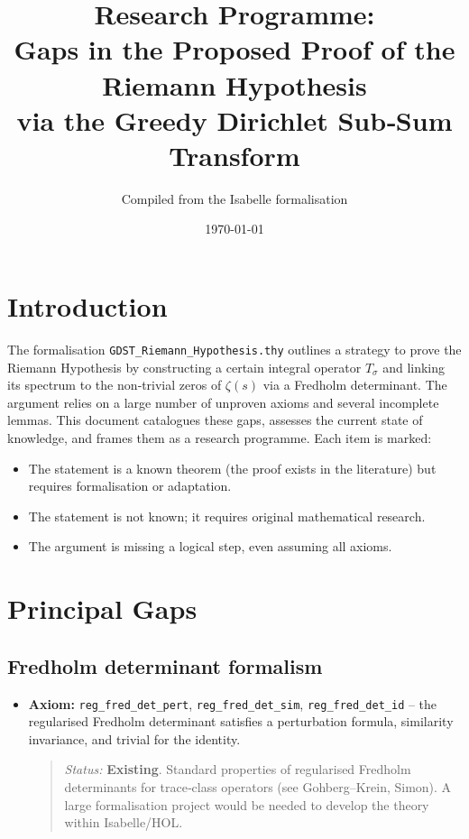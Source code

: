\documentclass{article}
\title{Research Programme:\\
Gaps in the Proposed Proof of the Riemann Hypothesis\\
via the Greedy Dirichlet Sub‑Sum Transform}
\author{Compiled from the Isabelle formalisation}
\date{\today}
\begin{document}
\maketitle
\section{Introduction}
The formalisation \texttt{GDST\_Riemann\_Hypothesis.thy} outlines a strategy to prove the Riemann Hypothesis by constructing a certain integral operator $T_\sigma$ and linking its spectrum to the non‑trivial zeros of $\zeta(s)$ via a Fredholm determinant.  The argument relies on a large number of unproven axioms and several incomplete lemmas.  This document catalogues these gaps, assesses the current state of knowledge, and frames them as a research programme.  Each item is marked:
\begin{itemize}
  \item[\textbf{Existing}] The statement is a known theorem (the proof exists in the literature) but requires formalisation or adaptation.
  \item[\textbf{New}] The statement is not known; it requires original mathematical research.
  \item[\textbf{Gap}] The argument is missing a logical step, even assuming all axioms.
\end{itemize}

\section{Principal Gaps}
\subsection{Fredholm determinant formalism}
\begin{itemize}
  \item \textbf{Axiom:} \texttt{reg\_fred\_det\_pert}, \texttt{reg\_fred\_det\_sim}, \texttt{reg\_fred\_det\_id} – the regularised Fredholm determinant satisfies a perturbation formula, similarity invariance, and trivial for the identity.
  \begin{quote}
    \emph{Status:} \textbf{Existing}.  Standard properties of regularised Fredholm determinants for trace‑class operators (see Gohberg–Krein, Simon).  A large formalisation project would be needed to develop the theory within Isabelle/HOL.
  \end{quote}
\end{itemize}
\end{document}
